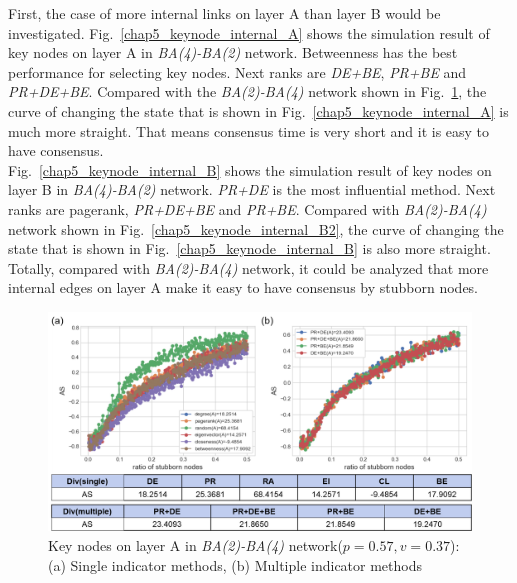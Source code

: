 First, the case of more internal links on layer A than layer B would be investigated. 
Fig.~\ref{chap5_keynode_internal_A} shows the simulation result of key nodes on layer A in \textit{BA(4)-BA(2)} network. Betweenness has the best performance for selecting key nodes. Next ranks are \textit{DE+BE}, \textit{PR+BE} and \textit{PR+DE+BE}. Compared with the \textit{BA(2)-BA(4)} network shown in Fig.~\ref{chap5_keynode_internal_A2}, the curve of changing the state that is shown in Fig.~\ref{chap5_keynode_internal_A} is much more straight. That means consensus time is very short and it is easy to have consensus.\\   
Fig.~\ref{chap5_keynode_internal_B} shows the simulation result of key nodes on layer B in \textit{BA(4)-BA(2)} network. \textit{PR+DE} is the most influential method. Next ranks are pagerank, \textit{PR+DE+BE} and \textit{PR+BE}. Compared with \textit{BA(2)-BA(4)} network shown in Fig.~\ref{chap5_keynode_internal_B2}, the curve of changing the state that is shown in Fig.~\ref{chap5_keynode_internal_B} is also more straight. \\ 
Totally, compared with \textit{BA(2)-BA(4)} network, it could be analyzed that more internal edges on layer A make it easy to have consensus by stubborn nodes. \\
\begin{figure}[!htb]
	\centering
	\includegraphics[width=\hsize]{figure/chap5_keynode_internal_A2.png}
	\caption{Key nodes on layer A in \textit{BA(2)-BA(4)} network($p=0.57, v=0.37$):
		(a) Single indicator methods, (b) Multiple indicator methods}
	\label{chap5_keynode_internal_A2}
\end{figure}
